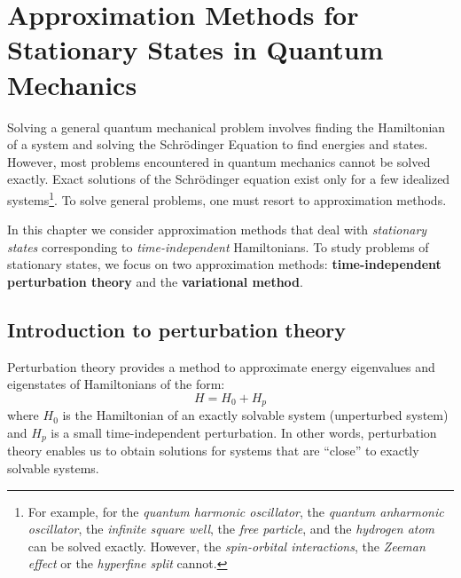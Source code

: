 \section{Approximation Methods for Stationary States in Quantum Mechanics}

Solving a general quantum mechanical problem involves finding the Hamiltonian of a system and solving the Schrödinger Equation to find energies and states. However, most problems encountered in quantum mechanics cannot be solved exactly. Exact solutions of the Schrödinger equation exist only for a few idealized systems\footnote{For example, for the \textit{quantum harmonic oscillator}, the \textit{quantum anharmonic oscillator}, the \textit{infinite square well}, the \textit{free particle}, and the \textit{hydrogen atom} can be solved exactly. However, the \textit{spin-orbital interactions}, the \textit{Zeeman effect} or the \textit{hyperfine split} cannot.}. To solve general problems, one must resort to approximation methods.

In this chapter we consider approximation methods that deal with \textit{stationary states} corresponding to \textit{time-independent} Hamiltonians. To study problems of stationary states, we focus on two approximation methods: \textbf{time-independent perturbation theory} and the \textbf{variational method}.

\subsection{Introduction to perturbation theory}

Perturbation theory provides a method to approximate energy eigenvalues and eigenstates of Hamiltonians of the form:
\begin{equation}
    H = H_0 + H_p
\end{equation}
where $H_0$ is the Hamiltonian of an exactly solvable system (unperturbed system) and $H_p$ is a small time-independent perturbation. In other words, perturbation theory enables us to obtain solutions for systems that are ``close'' to exactly solvable systems.

